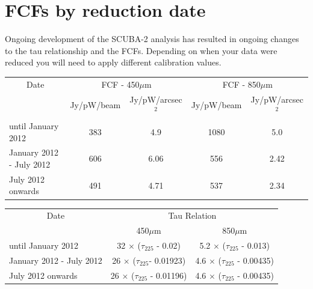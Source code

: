 \documentclass[11pt,oneside,chapters]{starlink}
\begin{document}
\newpage
\chapter{FCFs by reduction date}
\label{app:fcfs}

Ongoing development of the SCUBA-2 analysis has resulted in ongoing
changes to the tau relationship and the FCFs. Depending on when your
data were reduced you will need to apply different calibration values.
\\
\begin{table}[h!]
\begin{center}
\begin{tabular}{|l|c|c|c|c|}
 \hline
 \multicolumn{1}{|c|}{Date} &
 \multicolumn{2}{c|}{FCF - 450$\mu$m} &
 \multicolumn{2}{c|}{FCF - 850$\mu$m} \\
\cline{2-5}
& Jy/pW/beam &Jy/pW/arcsec$^2$ & Jy/pW/beam &Jy/pW/arcsec$^2$ \\
 \hline
until January 2012 &383  & 4.9&1080 &5.0 \\
January 2012 - July 2012&606&6.06 &556 &2.42 \\
July 2012 onwards&491 &4.71 &537 &2.34 \\
\hline
\end{tabular}
\end{center}
\end{table}
\vspace{-2mm}
\begin{table}[h!]
\begin{center}
\begin{tabular}{|l|c|c|}
 \hline
 \multicolumn{1}{|c}{Date} & \multicolumn{2}{|c|}{Tau Relation}  \\ \cline{2-3}
                           & 450$\mu$m  & 850$\mu$m \\ \hline
until January 2012       & 32 $\times$ ($\tau_{225}$ - 0.02)    & 5.2 $\times$ ($\tau_{225}$ - 0.013)  \\
January 2012 - July 2012 & 26 $\times$ ($\tau_{225}$- 0.01923)  & 4.6 $\times$ ($\tau_{225}$ - 0.00435)  \\
July 2012 onwards        & 26 $\times$ ($\tau_{225}$ - 0.01196) & 4.6 $\times$ ($\tau_{225}$ - 0.00435)  \\
\hline
\end{tabular}
\end{center}
\end{table}
\end{document}
